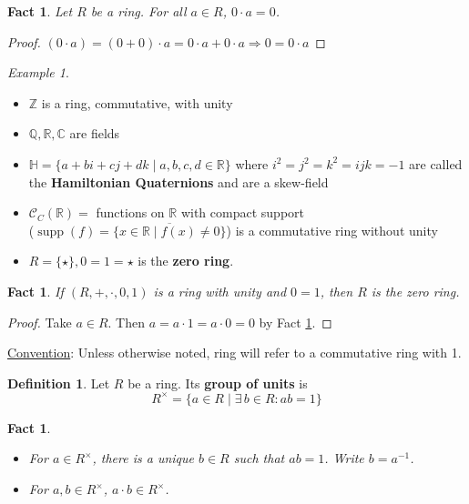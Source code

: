 \documentclass{amsart}
\newcommand{\RR}{\mathbb{R}}
\newcommand{\HH}{\mathbb{H}}
\newcommand{\QQ}{\mathbb{Q}}
\newcommand{\ZZ}{\mathbb{Z}}
\newcommand{\CC}{\mathbb{C}}
\DeclareMathOperator{\supp}{supp}
\newtheorem{fact}[thm]{Fact}
\theoremstyle{definition}
\newtheorem{defn}[thm]{Definition}
\theoremstyle{remark}
\newtheorem*{ex}{Example}
\begin{document}
\begin{fact}\label{fact:0prod}
 Let $R$ be a ring. For all $a \in R$, $0 \cdot a = 0$.
\end{fact}
\begin{proof}
    $(0 \cdot a) = (0 + 0) \cdot a = 0 \cdot a + 0 \cdot a \Rightarrow 0 = 0 \cdot a$
\end{proof}
\begin{ex} \hspace{0.5cm}
    \begin{itemize}
        \item $\ZZ$ is a ring, commutative, with unity
        \item $\QQ, \RR, \CC$ are fields
        \item $\HH = \{a + bi + cj + dk \mid a,b,c,d \in \RR \}$ where $i^2 = j^2 = k^2 = ijk = -1$ are
        called the \textbf{Hamiltonian Quaternions} and are a skew-field
        \item $\mathcal{C}_{C}(\RR) = $ functions on $\RR$ with compact
        support \\
        ($\supp(f) = \overline{\{x \in \RR \mid f(x) \neq 0\}}$) is a
        commutative ring without unity
        \item $R = \{\star\}, 0 = 1 = \star$ is the \textbf{zero ring}.
    \end{itemize}
\end{ex}
\begin{fact}
    If $(R,+,\cdot,0,1)$ is a ring with unity and $0 = 1$, then $R$ is the zero ring.
\end{fact}
\begin{proof}
    Take $a \in R$. Then $a = a \cdot 1 = a \cdot 0 = 0$ by Fact \ref{fact:0prod}.
\end{proof}
\noindent \underline{Convention}: Unless otherwise noted, ring will refer to
a commutative ring with 1.
\begin{defn}
    Let $R$ be a ring. Its \textbf{group of units} is
    $$
    R^\times = \{a \in R \mid \exists \, b \in R: ab = 1\}
    $$
\end{defn}
\begin{fact} \hspace{0.5cm}
    \begin{itemize}
        \item For $a \in R^\times$, there is a unique $b \in R$ such that $ab = 1$.
        Write $b = a^{-1}$.
        \item For $a,b \in R^\times$, $a \cdot b \in R^\times$.
    \end{itemize}
\end{fact}
\end{document}
